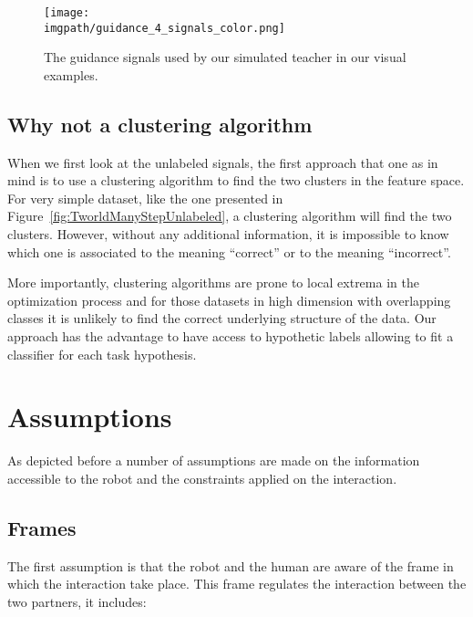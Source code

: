 \begin{figure}[!ht]
  \centering
  \texttt{[image: \\imgpath/guidance\_4\_signals\_color.png]}
  \caption{The guidance signals used by our simulated teacher in our visual examples.}
  \label{fig:guidancesignals}
\end{figure}

\subsection{Why not a clustering algorithm}
\label{chapter:lfui:whynotEM}

When we first look at the unlabeled signals, the first approach that one as in mind is to use a clustering algorithm to find the two clusters in the feature space. For very simple dataset, like the one presented in Figure~\ref{fig:TworldManyStepUnlabeled}, a clustering algorithm will find the two clusters. However, without any additional information, it is impossible to know which one is associated to the meaning ``correct'' or to the meaning ``incorrect''.

More importantly, clustering algorithms are prone to local extrema in the optimization process and for those datasets in high dimension with overlapping classes it is unlikely to find the correct underlying structure of the data. Our approach has the advantage to have access to hypothetic labels allowing to fit a classifier for each task hypothesis.

\section{Assumptions}
\label{chapter:lfui:assumptions}

As depicted before a number of assumptions are made on the information accessible to the robot and the constraints applied on the interaction.

\subsection{Frames}

The first assumption is that the robot and the human are aware of the frame in which the interaction take place. This frame regulates the interaction between the two partners, it includes:

